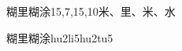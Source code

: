 \begin{entry}{糊里糊涂}{15,7,15,10}{⽶、⾥、⽶、⽔}
  \begin{phonetics}{糊里糊涂}{hu2li5hu2tu5}
  \end{phonetics}
\end{entry}
